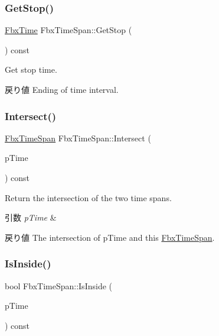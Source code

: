 \subsubsection{\texorpdfstring{Get\+Stop()}{GetStop()}}
{\footnotesize\ttfamily \hyperlink{class_fbx_time}{Fbx\+Time} Fbx\+Time\+Span\+::\+Get\+Stop (\begin{DoxyParamCaption}{ }\end{DoxyParamCaption}) const}

Get stop time. \begin{DoxyReturn}{戻り値}
Ending of time interval. 
\end{DoxyReturn}
\mbox{\label{class_fbx_time_span_a8be395bd3e5dfbdcd2bc1551832e04b1}} 
\subsubsection{\texorpdfstring{Intersect()}{Intersect()}}
{\footnotesize\ttfamily \hyperlink{class_fbx_time_span}{Fbx\+Time\+Span} Fbx\+Time\+Span\+::\+Intersect (\begin{DoxyParamCaption}\item[{const \hyperlink{class_fbx_time_span}{Fbx\+Time\+Span} \&}]{p\+Time }\end{DoxyParamCaption}) const}

Return the intersection of the two time spans. 
\begin{DoxyParams}{引数}
{\em p\+Time} & \\
\hline
\end{DoxyParams}
\begin{DoxyReturn}{戻り値}
The intersection of p\+Time and this \hyperlink{class_fbx_time_span}{Fbx\+Time\+Span}. 
\end{DoxyReturn}
\mbox{\label{class_fbx_time_span_a969295da345c8c9e574acbbcda1d59e0}} 
\subsubsection{\texorpdfstring{Is\+Inside()}{IsInside()}}
{\footnotesize\ttfamily bool Fbx\+Time\+Span\+::\+Is\+Inside (\begin{DoxyParamCaption}\item[{\hyperlink{class_fbx_time}{Fbx\+Time}}]{p\+Time }\end{DoxyParamCaption}) const}

